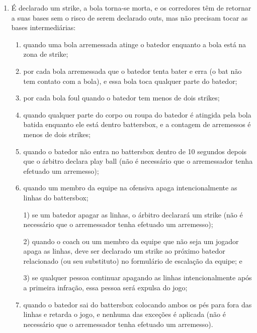 \begin{enumerate}[label=(\alph*)]
\item  É declarado um \gls{strike}, a bola torna-se morta, e os corredores têm de retornar a suas bases sem o risco de serem declarado \gls{out}s, mas não precisam tocar  as bases intermediárias:

	 \begin{enumerate}[label=\roman*.]
	 	\item quando uma bola arremessada atinge o batedor enquanto a bola está na zona  de \gls{strike};
	\item por cada bola arremessada que o batedor tenta bater e erra (o \gls{bat} não tem contato com a bola), e essa bola toca qualquer parte do batedor;
	\item por cada bola \gls{foul} quando o batedor tem menos de dois \glspl{strike};
	\item quando qualquer parte do corpo ou roupa do batedor é atingida pela bola batida enquanto ele está dentro \gls{battersbox}, e a contagem de arremessos é menos de dois \glspl{strike};
	\item quando o batedor não entra no \gls{battersbox} dentro de 10 segundos depois que o árbitro declara \gls{play ball} (não é necessário que o arremessador tenha efetuado um arremesso);
	\item quando um membro da equipe na ofensiva apaga intencionalmente as linhas do \gls{battersbox};

	 1) se um batedor apagar as linhas, o árbitro declarará um \gls{strike} (não é necessário que o arremessador tenha efetuado um arremesso);

	 2) quando o \gls{coach} ou um membro da equipe que não seja um jogador apaga as linhas, deve ser declarado um \gls{strike} ao próximo batedor relacionado (ou seu substituto) no formulário de escalação da equipe; e

	 3) se qualquer pessoa continuar apagando as linhas intencionalmente após a primeira infração, essa pessoa será expulsa do jogo;

	\item quando o batedor sai do \gls{battersbox} colocando ambos os pés para fora das linhas e retarda o jogo, e nenhuma das exceções é aplicada (não é necessário que o arremessador tenha efetuado um arremesso).

	\end{enumerate}

\end{enumerate}

